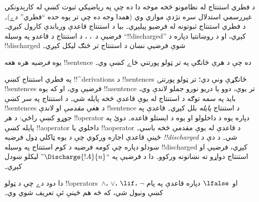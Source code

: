 \documentclass[../../../include/open-logic-section]{subfiles}
\begin{document}
      {}
      {}


\begin{explain}
د فطري استنتاج له نظامونو څخه موخه دا ده چې په رياضيکي ثبوت کښې له
کارېدونکي غيررسمي استدلال سره نژدې موازي وي (همدا وجه ده چې تر يوه
حده “فطري” دے)۔ د فطري استنتاج ثبوتونه له فرضيو پيلېږي۔ بيا د
استنتاج قاعدې ورباندې کارول کېږي۔ فرضيې د~\Intro{\lnot}،
\Intro{\lif}،  د استنتاج د قاعدو په وسيله “!!{discharged}” کېږي،
او د روښانتيا دپاره د !!{discharged} شوې فرضيې نښان د استنتاج تر
څنګ ليکل کېږي۔
\end{explain}

\begin{defn}[فرضيه]
يوه \emph{فرضيه} هره هغه !!{sentence} ده چې د هرې څانګې په تر ټولو
پورتني ځاے کښې وي۔
\end{defn}

په فطري استنتاج کښې !!^{derivation}s د !!{sentence}s ځانګړې ونې دي؛
تر ټولو پورتنۍ !!{sentence}s فرضيې وي، او که يوه !!a{sentence} تر
يوې، دوو يا دريو نورو جملو لاندې وي، بايد په سمه توګه د استنتاج له
يوې قاعدې څخه پايله شي۔ د استنتاج په سر کښې !!{sentence}s د هغې
\emph{مقدمې} او لاندې !!{sentence} د استنتاج \emph{پايله} بلل کېږي۔
قاعدې په جوړو کښې راځي: د هر !!{operator} دپاره يوه د داخلولو او
يوه د ايستلو قاعده۔ دوئ په پايله کښې !!a{operator} داخلوي يا
!!a{operator} د قاعدې له يوې مقدمې څخه باسي۔ ځينې قاعدې اجازه
ورکوي چې د يوه ټاکلي
ډول فرضيه \emph{!!{discharged}} شي۔ د دې د ښودلو دپاره چې کومه
فرضيه د کوم استنتاج په وسيله !!{discharged} کېږي، فرضيې او استنتاج
دواړو ته نښانونه ورکوو۔ دا د فرضيې په “$\Discharge{!A}{n}$” ليکلو
ښودل کېږي۔


%
	{دا دود دے چې د ټولو !!{operator}s~$\land$، $\lor$، $\lif$،
    $\lnot$ او~$\lfalse$ دپاره قاعدې په پام کښې ونيول شي، که څه هم
    ځينې ئې تعريف شوي وي۔}
\end{document}
